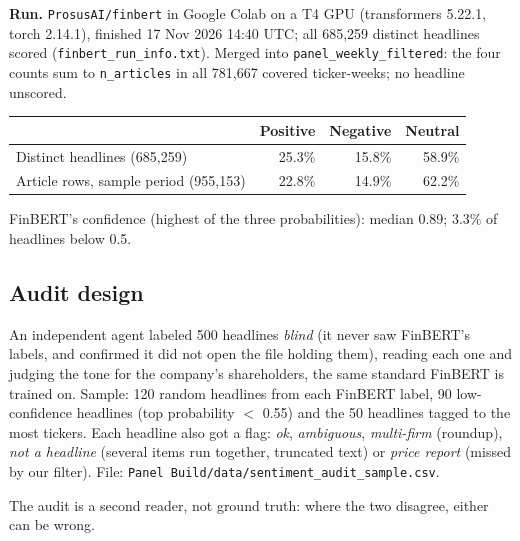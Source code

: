 \documentclass[11pt]{article}
\newcommand{\var}[1]{\texttt{#1}}
\begin{document}
\textbf{Run.} \var{ProsusAI/finbert} in Google Colab on a T4 GPU (transformers 5.22.1, torch 2.14.1), finished 17 Nov 2026 14:40 UTC; all 685,259 distinct headlines scored (\var{finbert\_run\_info.txt}). Merged into \var{panel\_weekly\_filtered}: the four counts sum to \var{n\_articles} in all 781,667 covered ticker-weeks; no headline unscored.

\begin{center}\small
\begin{tabular}{@{}lrrr@{}}
\toprule
 & Positive & Negative & Neutral\\
\midrule
Distinct headlines (685,259) & 25.3\% & 15.8\% & 58.9\%\\
Article rows, sample period (955,153) & 22.8\% & 14.9\% & 62.2\%\\
\bottomrule
\end{tabular}
\end{center}
FinBERT's confidence (highest of the three probabilities): median 0.89; 3.3\% of headlines below 0.5.

\subsection{Audit design}
An independent agent labeled 500 headlines \emph{blind} (it never saw FinBERT's labels, and confirmed it did not open the file holding them), reading each one and judging the tone for the company's shareholders, the same standard FinBERT is trained on. Sample: 120 random headlines from each FinBERT label, 90 low-confidence headlines (top probability $<$ 0.55) and the 50 headlines tagged to the most tickers. Each headline also got a flag: \emph{ok}, \emph{ambiguous}, \emph{multi-firm} (roundup), \emph{not a headline} (several items run together, truncated text) or \emph{price report} (missed by our filter). File: \var{Panel Build/data/sentiment\_audit\_sample.csv}.

The audit is a second reader, not ground truth: where the two disagree, either can be wrong.
\end{document}
